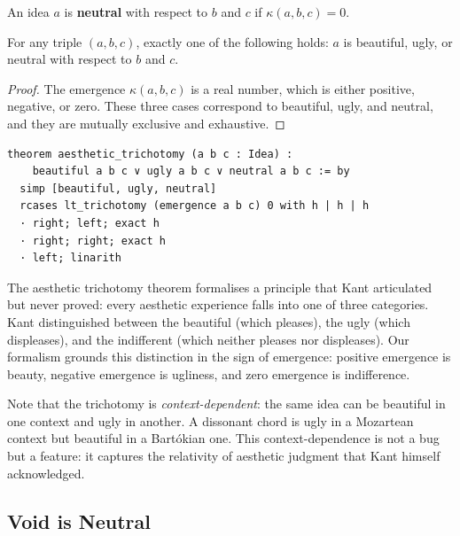 \begin{definition}
\label{def:neutral}
An idea $a$ is \textbf{neutral} with respect to $b$ and $c$ if
$\kappa(a, b, c) = 0$.
\end{definition}

\begin{theorem}
\label{thm:aesthetic-trichotomy}
For any triple $(a, b, c)$, exactly one of the following holds:
$a$ is beautiful, ugly, or neutral with respect to $b$ and $c$.
\end{theorem}

\begin{proof}
The emergence $\kappa(a, b, c)$ is a real number, which is either positive,
negative, or zero.  These three cases correspond to beautiful, ugly, and
neutral, and they are mutually exclusive and exhaustive.
\end{proof}

\begin{lstlisting}
theorem aesthetic_trichotomy (a b c : Idea) :
    beautiful a b c ∨ ugly a b c ∨ neutral a b c := by
  simp [beautiful, ugly, neutral]
  rcases lt_trichotomy (emergence a b c) 0 with h | h | h
  · right; left; exact h
  · right; right; exact h
  · left; linarith
\end{lstlisting}

\begin{interpretation}
\label{int:trichotomy-kant}
The aesthetic trichotomy theorem formalises a principle that Kant
articulated but never proved: every aesthetic experience falls into
one of three categories.  Kant distinguished between the beautiful
(which pleases), the ugly (which displeases), and the indifferent
(which neither pleases nor displeases).  Our formalism grounds this
distinction in the sign of emergence: positive emergence is beauty,
negative emergence is ugliness, and zero emergence is indifference.

Note that the trichotomy is \emph{context-dependent}: the same idea
can be beautiful in one context and ugly in another.  A dissonant chord
is ugly in a Mozartean context but beautiful in a Bartókian one.  This
context-dependence is not a bug but a feature: it captures the
relativity of aesthetic judgment that Kant himself acknowledged.
\end{interpretation}

\subsection{Void is Neutral}

